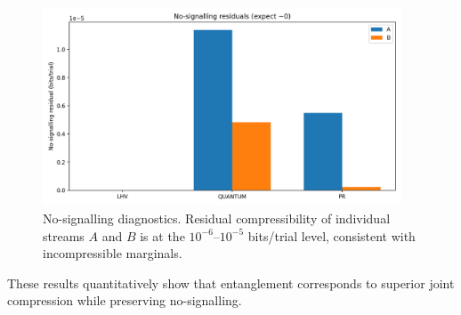 \documentclass[aps,preprint,onecolumn,longbibliography,nofootinbib]{revtex4-2}
\numberwithin{equation}{section}        %
\begin{document}
\begin{figure}[H]
\centering
\includegraphics[width=0.95\textwidth]{No-signalling_residuals_expect_0_.png}
\caption{No-signalling diagnostics. Residual compressibility of individual streams $A$ and $B$ is at the $10^{-6}$--$10^{-5}$ bits/trial level, consistent with incompressible marginals.}
\label{fig:nosig}
\end{figure}

\noindent These results quantitatively show that entanglement corresponds to superior joint compression while preserving no-signalling.

\end{document}
